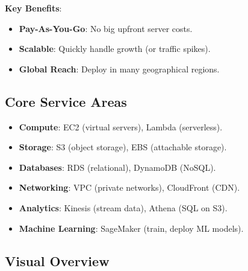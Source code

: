 \documentclass[12pt]{article}
\begin{document}
\textbf{Key Benefits}:
\begin{itemize}
    \item \textbf{Pay-As-You-Go}: No big upfront server costs.
    \item \textbf{Scalable}: Quickly handle growth (or traffic spikes).
    \item \textbf{Global Reach}: Deploy in many geographical regions.
\end{itemize}

\subsection{Core Service Areas}
\begin{itemize}
    \item \textbf{Compute}: EC2 (virtual servers), Lambda (serverless).
    \item \textbf{Storage}: S3 (object storage), EBS (attachable storage).
    \item \textbf{Databases}: RDS (relational), DynamoDB (NoSQL).
    \item \textbf{Networking}: VPC (private networks), CloudFront (CDN).
    \item \textbf{Analytics}: Kinesis (stream data), Athena (SQL on S3).
    \item \textbf{Machine Learning}: SageMaker (train, deploy ML models).
\end{itemize}

\subsection{Visual Overview}
\begin{center}
\end{center}
\end{document}
